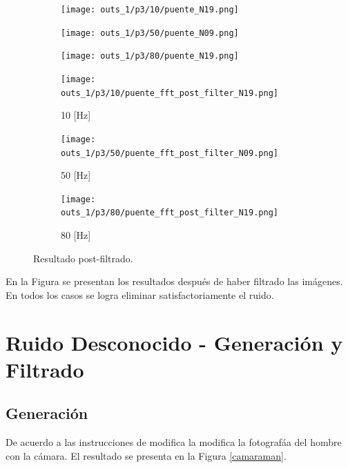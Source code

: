 \documentclass[
  letterpaper,
  twocolumn,
  9pt,
  journal,
  final]{IEEEtran}
\begin{document}
\begin{figure}[!tbh]
	\centering

  \begin{subfigure}[b]{.3\linewidth}
    \texttt{[image: outs\_1/p3/10/puente\_N19.png]}
	\end{subfigure}
  \begin{subfigure}[b]{.3\linewidth}
    \texttt{[image: outs\_1/p3/50/puente\_N09.png]}
	\end{subfigure}
  \begin{subfigure}[b]{.3\linewidth}
    \texttt{[image: outs\_1/p3/80/puente\_N19.png]}
	\end{subfigure}

  \begin{subfigure}[b]{.3\linewidth}
		\texttt{[image: outs\_1/p3/10/puente\_fft\_post\_filter\_N19.png]}
		\caption{10 [Hz]}
	\end{subfigure}
  \begin{subfigure}[b]{.3\linewidth}
    \texttt{[image: outs\_1/p3/50/puente\_fft\_post\_filter\_N09.png]}
		\caption{50 [Hz]}
	\end{subfigure}
  \begin{subfigure}[b]{.3\linewidth}
    \texttt{[image: outs\_1/p3/80/puente\_fft\_post\_filter\_N19.png]}
		\caption{80 [Hz]}
	\end{subfigure}

  \caption{Resultado post-filtrado.} \label{fig:post-filt}
\end{figure}


En la Figura \label{fig:post} se presentan los resultados después de haber filtrado las imágenes. En todos los casos se logra eliminar satisfactoriamente el ruido.

\section{Ruido Desconocido - Generación y Filtrado}

\subsection{Generación}

De acuerdo a las instrucciones de modifica la modifica la fotografáa del hombre con la cámara. El resultado se presenta en la Figura \ref{camaraman}.
\end{document}
